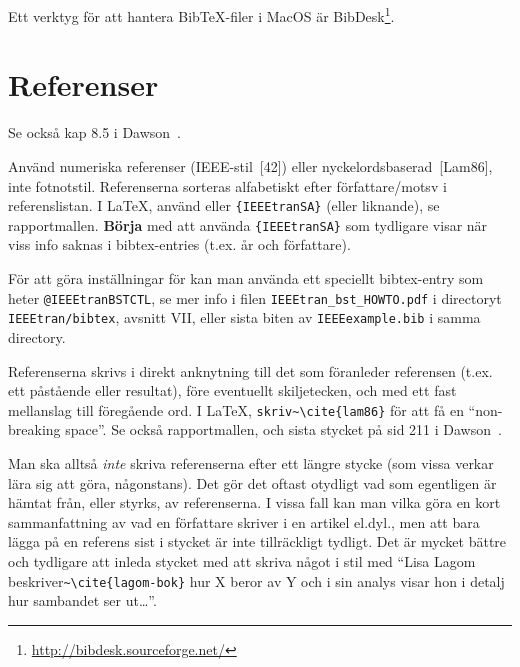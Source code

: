 Ett verktyg för att hantera BibTeX-filer i MacOS är BibDesk\footnote{\url{http://bibdesk.sourceforge.net/}}.

\section{Referenser}
\label{sec:referenser}

Se också kap 8.5 i Dawson~\cite{dawson:projects-in-computing}.

\begin{center}
\end{center}

Använd numeriska referenser (IEEE-stil~[42]) eller nyckelordsbaserad~[Lam86], inte fotnotstil. Referenserna sorteras alfabetiskt efter författare/motsv i referenslistan. I LaTeX, använd \verb|| eller \verb|{IEEEtranSA}| (eller liknande), se rapportmallen. \textbf{Börja} med att använda \verb|{IEEEtranSA}| som tydligare visar när viss info saknas i bibtex-entries (t.ex. år och författare).

För att göra inställningar för \verb|| kan man använda ett speciellt bibtex-entry som heter \texttt{@IEEEtranBSTCTL}, se mer info i filen \texttt{IEEEtran\_bst\_HOWTO.pdf} i directoryt \texttt{IEEEtran/bibtex}, avsnitt VII, eller sista biten av \texttt{IEEEexample.bib} i samma directory.

Referenserna skrivs i direkt anknytning till det som föranleder referensen (t.ex. ett påstående eller resultat), före eventuellt skiljetecken, och med ett fast mellanslag till föregående ord. I La\TeX, \verb|skriv~\cite{lam86}| för att få en ``non-breaking space''. Se också rapportmallen, och sista stycket på sid 211 i Dawson~\cite{dawson:projects-in-computing}. 

Man ska alltså \emph{inte} skriva referenserna efter ett längre stycke (som vissa verkar lära sig att göra, någonstans). Det gör det oftast otydligt vad som egentligen är hämtat från, eller styrks, av referenserna. I vissa fall kan man vilka göra en kort sammanfattning av vad en författare skriver i en artikel el.dyl., men att bara lägga på en referens sist i stycket är inte tillräckligt tydligt. Det är mycket bättre och tydligare att inleda stycket med att skriva något i stil med ``Lisa Lagom beskriver\verb|~\cite{lagom-bok}| hur X beror av Y och i sin analys visar hon i detalj hur sambandet ser ut\ldots''.

